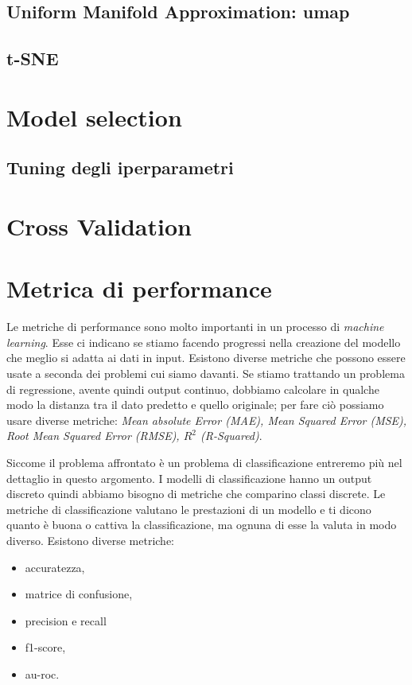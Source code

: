 \documentclass[12pt,italian]{report}
\begin{document}
	\subsection{Uniform Manifold Approximation: umap}
	\subsection{t-SNE}
	\section{Model selection}
	\subsection{Tuning degli iperparametri}

	\section{Cross Validation}
	
	\section{Metrica di performance}
	\label{Metriche_di_performance}
	Le metriche di performance sono molto importanti in un processo di \textit{machine learning}. Esse ci indicano se stiamo facendo progressi nella creazione del modello che meglio si adatta ai dati in input. Esistono diverse metriche che possono essere usate a seconda dei problemi cui siamo davanti. Se stiamo trattando un problema di regressione, avente quindi output continuo, dobbiamo calcolare in qualche modo la distanza tra il dato predetto e quello originale; per fare ciò possiamo usare diverse metriche: \textit{Mean absolute Error (MAE), Mean Squared Error (MSE), Root Mean Squared Error (RMSE), $R^2$ (R-Squared)}.
	
	Siccome il problema affrontato è un problema di classificazione entreremo più nel dettaglio in questo argomento. I modelli di classificazione hanno un output discreto quindi abbiamo bisogno di metriche che comparino classi discrete. Le metriche di classificazione valutano le prestazioni di un modello e ti dicono quanto è buona o cattiva la classificazione, ma ognuna di esse la valuta in modo diverso.
	Esistono diverse metriche:
	\begin{itemize}
		\item accuratezza,
		\item matrice di confusione,
		\item precision e recall
		\item f1-score,
		\item au-roc.
	\end{itemize}
\end{document}
